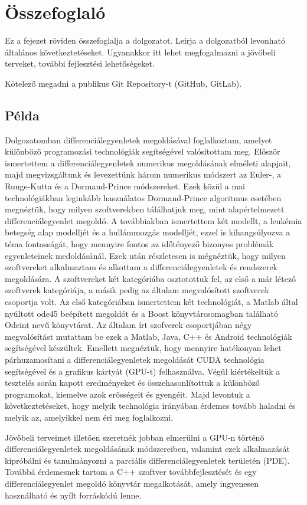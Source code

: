 \chapter*{Összefoglaló}


Ez a fejezet röviden összefoglalja a dolgozatot. Leírja a dolgozatból levonható általános következtetéseket. Ugyanakkor itt lehet megfogalmazni a jövőbeli terveket, további fejlesztési lehetőségeket.

Kötelező megadni a publikus Git Repository-t (GitHub, GitLab). 







\section{P\'elda}
Dolgozatomban differenciálegyenletek megoldásával foglalkoztam, amelyet különböző programozási technológiák segítségével valósítottam meg. Először ismertettem a differenciálegyenletek numerikus megoldásának elméleti alapjait, majd megvizsgáltunk és levezettünk három numerikus módszert az Euler-, a Runge-Kutta és a Dormand-Prince módszereket. Ezek közül a mai technológiákban leginkább használatos Dormand-Prince algoritmus esetében megnéztük, hogy milyen szoftverekben tálálhatjuk meg, mint alapértelmezett differenciálegyenlet megoldó. A továbbiakban ismertettem két modellt, a leukémia betegség alap modelljét és a hullámmozgás modelljét, ezzel is kihangsúlyozva a téma fontosságát, hogy mennyire fontos az időtényező bizonyos problémák egyenleteinek medoldásánál. Ezek után részletesen is mégnéztük, hogy milyen szoftvereket alkalmaztam és alkottam a differenciálegyenletek és rendszerek megoldására. A szoftvereket két kategóriába osztotottuk fel, az első a már létező szoftverek kategóriája, a másik pedig az általam megvalósított szoftverek csoportja volt. Az első kategóriában ismertettem két technológiát, a Matlab által nyúltott ode45 beépített megoldót és a Boost könyvtárcsomagban található Odeint nevű könyvtárat. Az általam írt szofverek csoportjában négy megvalósítást mutattam be ezek a Matlab, Java, C++ és Android technológiák segítségével készültek. Emellett megnéztük, hogy mennyire hatékonyan lehet párhuzamosítani a differenciálegyenletek megoldását CUDA technológia segítségével és a grafikus kártyát (GPU-t) felhasználva. Végül kiértékeltük a tesztelés során kapott eredményeket és összehasonlítottuk a különböző programokat, kiemelve azok erősségeit és gyengéit. Majd levontuk a következtetéseket, hogy melyik technológia irányában érdemes tovább haladni és melyik az, amelyikkel nem éri meg foglalkozni.

Jövőbeli terveimet illetően szeretnék jobban elmerülni a GPU-n történő differenciálegyenletek megoldásának módszereiben, valamint ezek alkalmazását kipróbálni és tanulmányozni a parciális differenciálegyenletek területén (PDE). Továbbá érdemesnek tartom a C++ szoftver továbbfejlesztését és egy differenciálegyenlet megoldó könyvtár megalkotását, amely ingyenesen használható és nyílt forráskódú lenne.